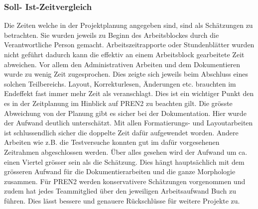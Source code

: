 \subsubsection{Soll- Ist-Zeitvergleich}
Die Zeiten welche in der Projektplanung angegeben sind, sind als Schätzungen 
zu betrachten. Sie wurden jeweils zu Beginn des Arbeitsblockes durch die 
Verantwortliche Person gemacht. Arbeitszeitrapporte oder Stundenblätter wurden 
nicht geführt dadurch kann die effektiv an einem Arbeitsblock gearbeitete Zeit 
abweichen. Vor allem den Administrativen Arbeiten und dem Dokumentieren wurde 
zu wenig Zeit zugesprochen. Dies zeigte sich jeweils beim Abschluss eines 
solchen Teilbereichs. Layout, Korrekturlesen, Änderungen etc. brauchten im 
Endeffekt fast immer mehr Zeit als veranschlagt. Dies ist ein wichtiger Punkt 
den es in der Zeitplanung im Hinblick auf PREN2 zu beachten gilt. Die grösste 
Abweichung von der Planung gibt es sicher bei der Dokumentation. Hier wurde 
der Aufwand deutlich unterschätzt. Mit allen Formatierungs- und Layoutarbeiten 
ist schlussendlich sicher die doppelte Zeit dafür aufgewendet worden. Andere 
Arbeiten wie z.B. die Testversuche konnten gut im dafür vorgesehenen Zeitrahmen 
abgeschlossen werden. Über alles gesehen wird der Aufwand um ca. einen Viertel 
grösser sein als die Schätzung. Dies hängt hauptsächlich mit dem grösseren 
Aufwand für die Dokumentierarbeiten und die ganze Morphologie zusammen. Für 
PREN2 werden konservativere Schätzungen vorgenommen und zudem hat jedes 
Teammitglied über den jeweiligen Arbeitsaufwand Buch zu führen. Dies lässt 
bessere und genauere Rückschlüsse für weitere Projekte zu. 